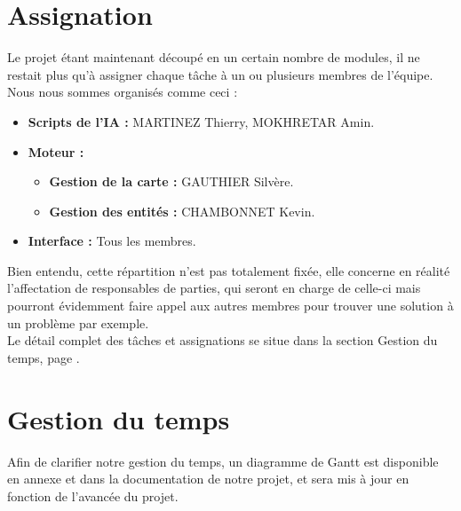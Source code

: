 \documentclass[a4paper]{article}
\newcommand{\alinea}{\hspace*{0.5cm}}
\begin{document}
    \section{Assignation}
      \alinea Le projet étant maintenant découpé en un certain nombre de modules, il ne restait plus qu'à assigner chaque tâche à un ou plusieurs membres de l'équipe. Nous nous sommes organisés comme ceci :
      \begin{itemize}
        \item \textbf{Scripts de l'IA :} MARTINEZ Thierry, MOKHRETAR Amin.
        \item \textbf{Moteur :}
        \begin{itemize}
          \item \textbf{Gestion de la carte :} GAUTHIER Silvère.
          \item \textbf{Gestion des entités :} CHAMBONNET Kevin.
        \end{itemize}
        \item \textbf{Interface :} Tous les membres.
      \end{itemize}
      \alinea Bien entendu, cette répartition n'est pas totalement fixée, elle concerne en réalité l'affectation de responsables de parties, qui seront en charge de celle-ci mais pourront évidemment faire appel aux autres membres pour trouver une solution à un problème par exemple.\\
      \alinea Le détail complet des tâches et assignations se situe dans la section Gestion du temps, page \pageref{GestionTps}.

    \section{Gestion du temps}
      \label{GestionTps}
      \alinea Afin de clarifier notre gestion du temps, un diagramme de Gantt est disponible en annexe et dans la documentation de notre projet, et sera mis à jour en fonction de l'avancée du projet.\\
\end{document}
